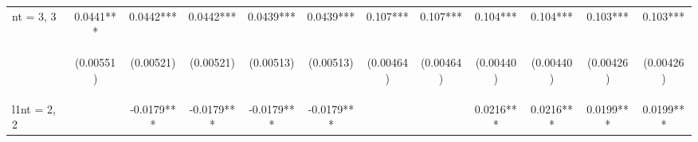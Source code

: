 \documentclass[]{article}
\begin{document}
\begin{center}
\begin{tabular}{lccccccccccc}
nt = 3, 3 & 0.0441*** & 0.0442*** & 0.0442*** & 0.0439*** & 0.0439*** & 0.107*** & 0.107*** & 0.104*** & 0.104*** & 0.103*** & 0.103*** \\
\vspace{4pt} & \begin{footnotesize}(0.00551)\end{footnotesize} & \begin{footnotesize}(0.00521)\end{footnotesize} & \begin{footnotesize}(0.00521)\end{footnotesize} & \begin{footnotesize}(0.00513)\end{footnotesize} & \begin{footnotesize}(0.00513)\end{footnotesize} & \begin{footnotesize}(0.00464)\end{footnotesize} & \begin{footnotesize}(0.00464)\end{footnotesize} & \begin{footnotesize}(0.00440)\end{footnotesize} & \begin{footnotesize}(0.00440)\end{footnotesize} & \begin{footnotesize}(0.00426)\end{footnotesize} & \begin{footnotesize}(0.00426)\end{footnotesize} \\
l1nt = 2, 2 &  & -0.0179*** & -0.0179*** & -0.0179*** & -0.0179*** &  &  & 0.0216*** & 0.0216*** & 0.0199*** & 0.0199*** \\

\end{tabular}
\end{center}
\end{document}

